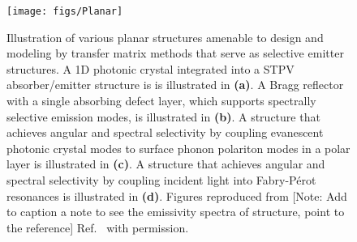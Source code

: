 \documentclass[10pt,letterpaper]{article}
\begin{document}
\begin{figure}[h]
	\texttt{[image: figs/Planar]}
	\caption{\label{Fan}  Illustration of various planar structures amenable to design and modeling
by transfer matrix methods that serve as selective emitter structures.  
A 1D photonic crystal integrated into a STPV absorber/emitter structure is  
is illustrated in {\bf (a)}.  A Bragg reflector with a single absorbing defect layer,
which supports spectrally selective emission modes, is illustrated in {\bf (b)}.
A structure that achieves angular and spectral selectivity by coupling evanescent photonic crystal modes
to surface phonon polariton modes in a polar layer is illustrated in {\bf (c)}.  
A structure that achieves angular and spectral selectivity by coupling incident light into Fabry-P\'{e}rot
resonances is illustrated in {\bf (d)}.  Figures reproduced from 
[Note:  Add to caption a note to see the emissivity spectra of structure, point to the reference]
Ref.~\cite{paper1_ref4, BN_JApplPhys_2005, LZ_JApplPhys_2006} with permission.}
\end{figure}
\end{document}
